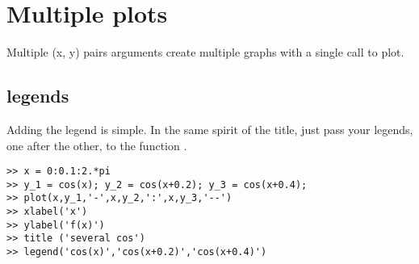 \section{Multiple plots}

Multiple (x, y) pairs arguments create multiple graphs with a single call to plot.
\subsection{legends}

Adding the legend is simple.
In the same spirit of the title, just pass your legends, one after the other, to the function .

\begin{lstlisting}
>> x = 0:0.1:2.*pi
>> y_1 = cos(x); y_2 = cos(x+0.2); y_3 = cos(x+0.4);
>> plot(x,y_1,'-',x,y_2,':',x,y_3,'--')
>> xlabel('x')
>> ylabel('f(x)')
>> title ('several cos')
>> legend('cos(x)','cos(x+0.2)','cos(x+0.4)')
\end{lstlisting}







